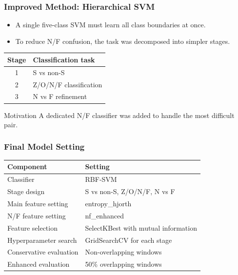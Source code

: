 \documentclass{beamer}
\begin{document}
\begin{frame}
\frametitle{Improved Method: Hierarchical SVM}
\begin{itemize}
\item A single five-class SVM must learn all class boundaries at once.
\item To reduce N/F confusion, the task was decomposed into simpler stages.
\end{itemize}

\vspace{0.2cm}
\begin{center}
\begin{tabular}{cl}
\toprule
Stage & Classification task\\
\midrule
1 & S vs non-S\\
2 & Z/O/N/F classification\\
3 & N vs F refinement\\
\bottomrule
\end{tabular}
\end{center}

\begin{block}{Motivation}
A dedicated N/F classifier was added to handle the most difficult pair.
\end{block}
\end{frame}

\begin{frame}
\frametitle{Final Model Setting}
\begin{table}
\centering
\begin{tabular}{ll}
\toprule
Component & Setting\\
\midrule
Classifier & RBF-SVM\\
Stage design & S vs non-S, Z/O/N/F, N vs F\\
Main feature setting & entropy\_hjorth\\
N/F feature setting & nf\_enhanced\\
Feature selection & SelectKBest with mutual information\\
Hyperparameter search & GridSearchCV for each stage\\
Conservative evaluation & Non-overlapping windows\\
Enhanced evaluation & 50\% overlapping windows\\
\bottomrule
\end{tabular}
\end{table}
\end{frame}
\end{document}
